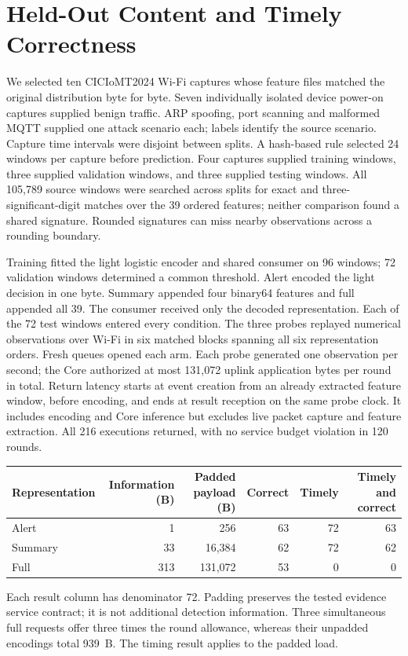 \documentclass[10pt,onecolumn]{IEEEtran}
\begin{document}
\section{Held-Out Content and Timely Correctness}
\label{sec:held_out_content}
We selected ten CICIoMT2024 Wi-Fi captures whose feature files matched the
original distribution byte for byte. Seven individually isolated device power-on
captures supplied benign traffic. ARP spoofing, port scanning and malformed
MQTT supplied one attack scenario each; labels identify the source scenario.
Capture time intervals were disjoint between splits. A hash-based rule selected
24 windows per capture before prediction. Four captures supplied training windows,
three supplied validation
windows, and three supplied testing windows. All 105,789 source windows were
searched across splits for exact and three-significant-digit matches over the
39 ordered features; neither comparison found a shared signature. Rounded
signatures can miss nearby observations across a rounding boundary.

Training fitted the light logistic encoder and shared consumer on 96 windows;
72 validation windows determined a common threshold. Alert encoded the light
decision in one byte. Summary appended four binary64 features and full appended
all 39. The consumer received only the decoded representation. Each of the
72 test windows entered every condition. The three probes replayed numerical
observations over Wi-Fi in six matched blocks spanning all six representation
orders. Fresh queues opened each arm. Each probe generated one observation
per second; the Core authorized at most 131,072 uplink application bytes per
round in total. Return latency starts at event creation from an already
extracted feature window, before encoding, and ends at result reception on
the same probe clock. It includes encoding and Core inference but excludes
live packet capture and feature extraction. All 216 executions returned,
with no service budget violation in 120 rounds.

\begin{center}\begin{tabular}{lrrrrr}\toprule
Representation & Information (B) & Padded payload (B) & Correct & Timely & Timely and correct\\ \midrule
Alert & 1 & 256 & 63 & 72 & 63\\
Summary & 33 & 16,384 & 62 & 72 & 62\\
Full & 313 & 131,072 & 53 & 0 & 0\\
\bottomrule\end{tabular}\end{center}
Each result column has denominator 72. Padding preserves the tested evidence
service contract; it is not additional detection information. Three simultaneous
full requests offer three times the round allowance, whereas their unpadded
encodings total 939~B. The timing result applies to the padded load.
\end{document}
